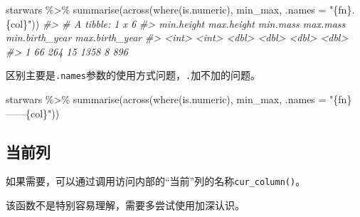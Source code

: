 \documentclass[
]{book}
\newenvironment{Shaded}{\begin{snugshade}}{\end{snugshade}}
\newcommand{\AttributeTok}[1]{\textcolor[rgb]{0.77,0.63,0.00}{#1}}
\newcommand{\CommentTok}[1]{\textcolor[rgb]{0.56,0.35,0.01}{\textit{#1}}}
\newcommand{\FunctionTok}[1]{\textcolor[rgb]{0.00,0.00,0.00}{#1}}
\newcommand{\NormalTok}[1]{#1}
\newcommand{\SpecialCharTok}[1]{\textcolor[rgb]{0.00,0.00,0.00}{#1}}
\newcommand{\StringTok}[1]{\textcolor[rgb]{0.31,0.60,0.02}{#1}}
\begin{document}
\begin{Shaded}
\begin{Highlighting}[]
\NormalTok{starwars }\SpecialCharTok{\%\textgreater{}\%} \FunctionTok{summarise}\NormalTok{(}\FunctionTok{across}\NormalTok{(}\FunctionTok{where}\NormalTok{(is.numeric), min\_max, }\AttributeTok{.names =} \StringTok{"\{fn\}.\{col\}"}\NormalTok{))}
\CommentTok{\#\textgreater{} \# A tibble: 1 x 6}
\CommentTok{\#\textgreater{}   min.height max.height min.mass max.mass min.birth\_year max.birth\_year}
\CommentTok{\#\textgreater{}        \textless{}int\textgreater{}      \textless{}int\textgreater{}    \textless{}dbl\textgreater{}    \textless{}dbl\textgreater{}          \textless{}dbl\textgreater{}          \textless{}dbl\textgreater{}}
\CommentTok{\#\textgreater{} 1         66        264       15     1358              8            896}
\end{Highlighting}
\end{Shaded}

区别主要是\texttt{.names}参数的使用方式问题，\texttt{.}加不加的问题。

\begin{Shaded}
\begin{Highlighting}[]

\NormalTok{starwars }\SpecialCharTok{\%\textgreater{}\%} \FunctionTok{summarise}\NormalTok{(}\FunctionTok{across}\NormalTok{(}\FunctionTok{where}\NormalTok{(is.numeric), min\_max, }\AttributeTok{.names =} \StringTok{"\{fn\}——\{col\}"}\NormalTok{))}
\end{Highlighting}
\end{Shaded}

\hypertarget{ux5f53ux524dux5217}{%
\subsection{当前列}\label{ux5f53ux524dux5217}}

如果需要，可以通过调用访问内部的``当前''列的名称\texttt{cur\_column()}。

该函数不是特别容易理解，需要多尝试使用加深认识。
\end{document}
